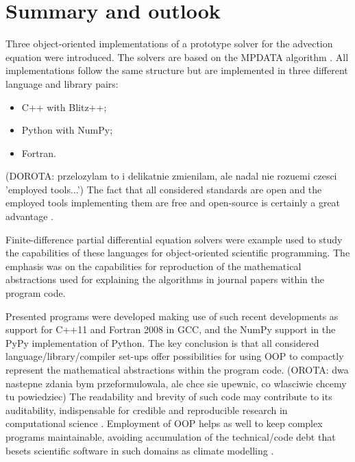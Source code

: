 \documentclass[final,5p,times,twocolumn]{elsarticle}
\begin{document}
  \section{Summary and outlook}

  Three object-oriented implementations of a prototype solver 
    for the advection equation were introduced.
  The solvers are based on the MPDATA algorithm \citep{Smolarkiewicz_2006}.
  All implementations follow the same structure but are implemented
    in three different language and library pairs:
  \begin{itemize}
    \item{C++ with Blitz++;}
    \item{Python with NumPy;}
    \item{Fortran.}
  \end{itemize}
(DOROTA: przelozylam to i delikatnie zmienilam, ale nadal nie rozuemi czesci 'employed tools...')
  The fact that all considered standards are open and the employed
    tools implementing them are free and open-source
    is certainly a great advantage \citep{Anel_2011}.

  Finite-difference partial differential equation solvers were example used to study 
    the capabilities of these languages
    for object-oriented scientific programming.
  The emphasis was on the capabilities for reproduction 
    of the mathematical abstractions used for explaining the algorithms
    in journal papers within the program code.

  Presented programs were developed making use of such recent
    developments as support for C++11 and Fortran 2008 in GCC, and
    the NumPy support in the PyPy implementation of Python.
  The key conclusion is that all considered language/library/compiler
    set-ups offer possibilities for using OOP to compactly 
     represent the mathematical abstractions within the program  code. 
(OROTA: dwa nastepne zdania bym przeformulowala, ale chce sie upewnic, co wlasciwie chcemy tu powiedziec)
  The readability and brevity of such code may contribute to its 
    auditability, indispensable for credible and reproducible research in computational science 
    \citep{Post_et_al_2005, Merali_et_al_2010, Stodden_et_al_2012}.
  Employment of OOP helps as well to keep complex programs maintainable, avoiding accumulation of the technical/code 
    debt \citep{Buschmann_2011} that besets scientific software in such domains as climate modelling
    \citep{Freeman_et_al_2010}.
\end{document}
